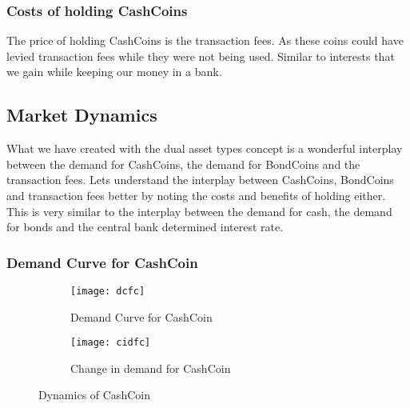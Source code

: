 \subsubsection{Costs of holding CashCoins}

The price of holding CashCoins is the transaction fees. As these coins could have levied transaction fees while they were not being used. Similar to interests that we gain while keeping our money in a bank.

\subsection{Market Dynamics}
What we have created with the dual asset types concept is a wonderful interplay between the demand for CashCoins, the demand for BondCoins and the transaction fees. Lets understand the interplay between CashCoins, BondCoins and transaction fees better by noting the costs and benefits of holding either. This is very similar to the interplay between the demand for cash, the demand for bonds and the central bank determined interest rate.

\subsubsection{Demand Curve for CashCoin}

\begin{figure}
     \centering
     \begin{subfigure}[b]{\linewidth}
         \centering
         \texttt{[image: dcfc]}
         \caption{Demand Curve for CashCoin}
         \label{fig21}
     \end{subfigure}
     \vspace{1mm}
     \begin{subfigure}[b]{\linewidth}
         \centering
         \texttt{[image: cidfc]}
         \caption{Change in demand for CashCoin}
         \label{fig22}
     \end{subfigure}
        \caption{Dynamics of CashCoin}
        \label{fig2}
\end{figure}




